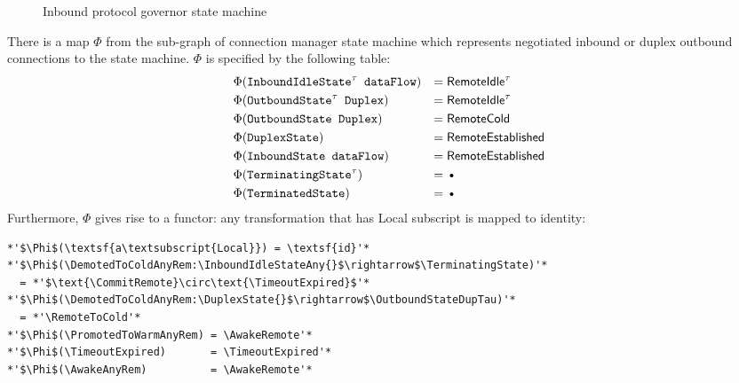 \begin{figure}[h]
  \caption{Inbound protocol governor state machine}
  \label{fig:inbgov-state-machine}
\end{figure}

There is a map \(\Phi\) from the sub-graph of connection manager state machine
which represents negotiated inbound or duplex outbound connections to the
\inbgov{} state machine. \(\Phi\) is specified by the following table:
\begin{align*}
  & \Phi(\text{\InboundIdleStateAny}) & =\; & \text{\RemoteIdle}\\
  & \Phi(\text{\OutboundStateDupTau}) & =\; & \text{\RemoteIdle}\\
  & \Phi(\text{\OutboundStateDup})    & =\; & \text{\RemoteCold} \\
  & \Phi(\text{\DuplexState})         & =\; & \text{\RemoteEstablished} \\
  & \Phi(\text{\InboundStateAny})     & =\; & \text{\RemoteEstablished} \\
  & \Phi(\text{\TerminatingState})    & =\; & \text{\FinalState} \\
  & \Phi(\text{\TerminatedState})     & =\; & \text{\FinalState} \\
\end{align*}
Furthermore, \(\Phi\) gives rise to a functor: any transformation that has
\textsf{Local} subscript is mapped to identity:
\begin{lstlisting}
*'$\Phi$(\textsf{a\textsubscript{Local}}) = \textsf{id}'*
*'$\Phi$(\DemotedToColdAnyRem:\InboundIdleStateAny{}$\rightarrow$\TerminatingState)'*
  = *'$\text{\CommitRemote}\circ\text{\TimeoutExpired}$'*
*'$\Phi$(\DemotedToColdAnyRem:\DuplexState{}$\rightarrow$\OutboundStateDupTau)'*
  = *'\RemoteToCold'*
*'$\Phi$(\PromotedToWarmAnyRem) = \AwakeRemote'*
*'$\Phi$(\TimeoutExpired)       = \TimeoutExpired'*
*'$\Phi$(\AwakeAnyRem)          = \AwakeRemote'*
\end{lstlisting}

